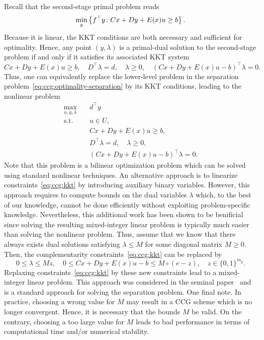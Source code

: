 Recall that the second-stage primal problem reads
\begin{equation*}
    \min_y\left\{ f^\top y \colon Cx + Dy + E(x)u \ge b \right\}.
\end{equation*}
Because it is linear, the KKT conditions are both necessary and sufficient for
optimality. Hence, any point $(y,\lambda)$ is a primal-dual solution to the
second-stage problem if and only if it satisfies its associated KKT system
\begin{equation*}
    Cx + Dy + E(x)u \ge b, \quad 
    D^\top \lambda = d, \quad 
    \lambda\ge 0, \quad
    (Cx + Dy + E(x)u - b)^\top \lambda = 0.
\end{equation*}
Thus, one can equivalently replace the lower-level problem in the separation
problem~\eqref{eq:ccg:optimality-separation} by its KKT conditions, leading to
the nonlinear problem
\begin{subequations}
    \begin{align}
        \max_{u,y,\lambda} \quad & d^\top y \\
        \text{s.t.} \quad & u\in U, \\
        & Cx + Dy + E(x)u \ge b, \\ 
        & D^\top \lambda = d, \quad \lambda\ge 0, \\
        & (Cx + Dy + E(x)u - b)^\top \lambda = 0. \label{eq:ccg:kkt}
    \end{align}
\end{subequations}
Note that this problem is a bilinear optimization problem which can be solved
using standard nonlinear techniques. An alternative approach is to linearize
constraints~\eqref{eq:ccg:kkt} by introducing auxiliary binary variables.
However, this approach requires to compute bounds on the dual variables
$\lambda$ which, to the best of our knowledge, cannot be done efficiently
without exploiting problem-specific knowledge. Nevertheless, this additional
work has been shown to be benificial since solving the resulting mixed-integer
linear problem is typically much easier than solving the nonlinear problem.
Thus, assume that we know that there always exists dual solutions satisfying
$\lambda \le M$ for some diagonal matrix $M \ge 0$. Then, the complementarity
constraints~\eqref{eq:ccg:kkt} can be replaced by
\begin{equation*}
    0 \le \lambda \le Mz, \quad 
    0 \le Cx + Dy + E(x)u - b \le M\circ(e - z), \quad 
    z\in\{0,1\}^{m_y}.
\end{equation*}
Replaxing constraints~\eqref{eq:ccg:kkt} by these new constraints lead to a
mixed-integer linear problem. This approach was considered in the seminal
paper~\textcite{Zeng2013} and is a standard approach for solving the
separation problem. One final note. In practice, choosing a wrong value for
$M$ may result in a CCG scheme which is no longer convergent. Hence, it is
necessary that the bounds $M$ be valid. On the contrary, choosing a too large
value for $M$ leads to bad performance in terms of computational time and/or
numerical stability. 

